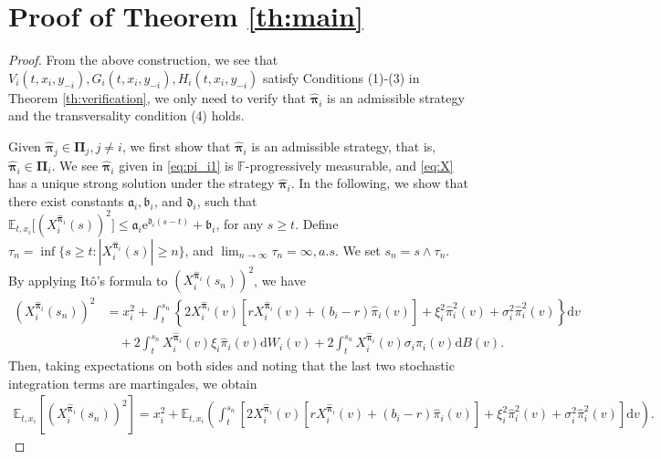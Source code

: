 \documentclass[11pt]{article}
\newcommand \drm {\mathrm{d}}
\newcommand \E {\mathbb{E}}
\newcommand \EE {\mathbb{E}}
\newcommand \e {\mathrm{e}}
\newenvironment{bluepar}
{\begingroup\color{blue}}
{\endgroup}
\numberwithin{equation}{section}
\renewcommand{\theequation}{\arabic{section}.\arabic{equation}}
\newcommand{\bpi}{\boldsymbol{\pi}}
\providecommand{\smn}{{-}} %
\begin{document}
\begin{bluepar}
\section{Proof of Theorem \ref{th:main}}\label{app:B}
\setcounter{equation}{0}
	\renewcommand{\theequation}{B.\arabic{equation}}
\begin{proof}
From the above construction, we see that $V_i(t,x_i,y_{\smn i}), G_i(t,x_i,y_{\smn i}), H_i(t,x_i,y_{\smn i})$ satisfy Conditions (1)-(3) in Theorem \ref{th:verification}, we only need to verify that $\widehat{\bm{\pi}}_i$ is an admissible strategy and the transversality condition (4) holds.

 Given $\widehat{\bm{\pi}}_j \in {\bm{\Pi}_j}, j\neq i$, we first show that $\widehat{\bm{\pi}}_i$ is an admissible strategy, that is, $\widehat{\bm{\pi}}_i \in {\bm{\Pi}_i}$.
We see $\widehat{\bm{\pi}}_i$ given in \eqref{eq:pi_i1} is $\mathbb{F}$-progressively measurable, and \eqref{eq:X} has a unique strong solution under the strategy $\widehat{\bm{\pi}}_i$.
In the following, we show that there exist constants $\mathfrak{a}_i, \mathfrak{b}_i$, and $\mathfrak{d}_i$, such that $\E_{t, {x_i}} \big[\left({X}^{\widehat{\bpi}_i}_i(s)\right)^2\big]\le \mathfrak{a}_i \e^{\mathfrak{d}_i (s-t)} + \mathfrak{b}_i$, for any $s\ge t$.
Define $\tau_n = \inf\{s \ge t: |{X}^{\widehat{\bpi}_i}_i(s)| \ge n\}$, and $\lim_{n \to \infty} \tau_n = \infty, a.s.$ We set $s_n= s\wedge \tau_n$.
By applying It\^o's formula to $(X_i^{\widehat{\bm{\pi}}_i}(s_n))^2$, we have
	\begin{align*}
		(X_i^{\widehat{\bm{\pi}}_i}(s_n))^2
		&= x^2_i+ \int_t^{s_n} \left\{ 2 X^{\widehat{\bpi}_i}_i(v)[r X^{\widehat{\bpi}_i}_i(v) + (b_i - r) \widehat{\pi}_i(v)] + \xi_i^2 \widehat{\pi}_i^2(v) + \sigma_i^2 {\widehat{\pi}}_i^2(v) \right\} \drm v \\
		&\quad + 2\int_t^{s_n} X^{\widehat{\bpi}_i}_i(v)\xi_i \widehat{\pi}_i(v) \drm W_i(v) + 2\int_t^{s_n} X^{\widehat{\bpi}_i}_i(v)\sigma_i \widehat{\pi}_i(v) \drm B(v).
	\end{align*}
Then, taking expectations on both sides and noting that the last two stochastic integration terms are martingales, we obtain
 \begin{align}
\EE_{t, x_i}[( X^{\widehat{\bpi}_i}_i(s_n))^2 ] = x^2_i + \EE_{t, x_i} \left( \int_t^{s_n}  \left[2X_i^{\widehat{\bm{\pi}}_i}(v)[r X^{\widehat{\bpi}_i}_i(v) + (b_i - r) \widehat{\pi}_i(v)] + \xi_i^2 \widehat{\pi}_i^2(v) + \sigma_i^2 \widehat{\pi}_i^2(v) \right] \drm v \right).

\end{align}
\end{proof}
\end{bluepar}
\end{document}

